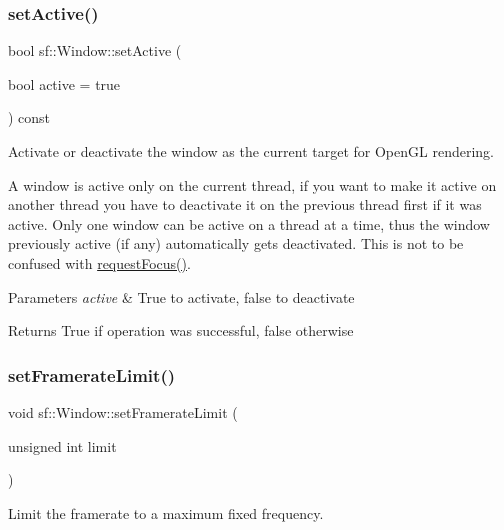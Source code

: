 \subsubsection{\texorpdfstring{setActive()}{setActive()}}
{\footnotesize\ttfamily bool sf\+::\+Window\+::set\+Active (\begin{DoxyParamCaption}\item[{bool}]{active = {\ttfamily true} }\end{DoxyParamCaption}) const}



Activate or deactivate the window as the current target for Open\+GL rendering. 

A window is active only on the current thread, if you want to make it active on another thread you have to deactivate it on the previous thread first if it was active. Only one window can be active on a thread at a time, thus the window previously active (if any) automatically gets deactivated. This is not to be confused with \mbox{\hyperlink{classsf_1_1_window_a58cf7fa1775e8e7542032e3ecfa83b49}{request\+Focus()}}.


\begin{DoxyParams}{Parameters}
{\em active} & True to activate, false to deactivate\\
\hline
\end{DoxyParams}
\begin{DoxyReturn}{Returns}
True if operation was successful, false otherwise \begin{DoxyVerb}\end{DoxyVerb}
 
\end{DoxyReturn}
\mbox{\label{classsf_1_1_window_af4322d315baf93405bf0d5087ad5e784}} 
\subsubsection{\texorpdfstring{setFramerateLimit()}{setFramerateLimit()}}
{\footnotesize\ttfamily void sf\+::\+Window\+::set\+Framerate\+Limit (\begin{DoxyParamCaption}\item[{unsigned int}]{limit }\end{DoxyParamCaption})}



Limit the framerate to a maximum fixed frequency. 

